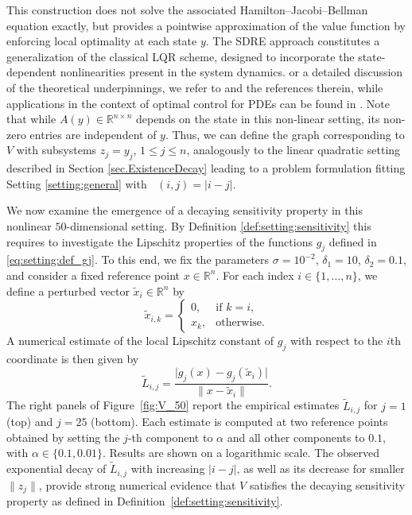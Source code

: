 \documentclass{article}
\newcommand{\R}{\mathbb{R}}
\newcommand{\Rn}{\R^n}
\DeclareMathOperator{\distG}{\operatorname{dist_\mathcal{G}}} %
\begin{document}
This construction does not solve the associated Hamilton--Jacobi--Bellman equation exactly, but provides a pointwise approximation of the value function by enforcing local optimality at each state \( y \). The SDRE approach constitutes a generalization of the classical LQR scheme, designed to incorporate the state-dependent nonlinearities present in the system dynamics. or a detailed discussion of the theoretical underpinnings, we refer to \cite{ccimen2008state} and the references therein, while applications in the context of optimal control for PDEs can be found in \cite{albi2022,alla2023state}.
Note that while $A(y) \in \R^{n \times n}$ depends on the state in this non-linear setting, its non-zero entries are independent of $y$. Thus, we can define the graph corresponding to $V$ with subsystems $z_j = y_j$, $1 \leq j \leq n$, analogously to the linear quadratic setting described in Section \ref{sec.ExistenceDecay} leading to a problem formulation fitting Setting \ref{setting:general} with $\distG(i,j) = | i - j |$. 

We now examine the emergence of a decaying sensitivity property in this nonlinear $50$-dimensional setting. By Definition \ref{def:setting:sensitivity} this requires to investigate the Lipschitz properties of the functions $g_j$ defined in \eqref{eq:setting:def_gj}. To this end, we fix the parameters
$\sigma = 10^{-2}$, $\delta_{1} = 10$, $\delta_{2} = 0.1$, and consider a fixed reference point $x \in \Rn$. For each index \(i \in \{1,\ldots,n\}\), we define a perturbed vector \(\tilde{x}_i \in \mathbb{R}^n\) by
\[
\tilde{x}_{i,k} = 
\begin{cases}
0, & \text{if } k = i, \\
x_k, & \text{otherwise}.
\end{cases}
\]
A numerical estimate of the local Lipschitz constant of \(g_j\) with respect to the \(i\)th coordinate is then given by
\[
\tilde{L}_{i,j}
= 
\frac{\lvert g_j(x) - g_j(\tilde{x}_i) \rvert}
{\|x - \tilde{x}_i\|}.
\]
The right panels of Figure~\ref{fig:V_50} report the empirical estimates \(\tilde{L}_{i,j}\) for \(j=1\) (top) and \(j=25\) (bottom). Each estimate is computed at two reference points obtained by setting the \(j\)-th component to \(\alpha\) and all other components to \(0.1\), with \(\alpha\in\{0.1,0.01\}\). Results are shown on a logarithmic scale. The observed exponential decay of $\tilde{L}_{i,j}$ with increasing $|i - j|$, as well as its decrease for smaller $\|z_j\|$, provide strong numerical evidence that $V$ satisfies the decaying sensitivity property as defined in Definition~\ref{def:setting:sensitivity}.
\end{document}
